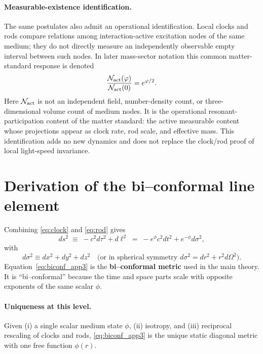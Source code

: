 \documentclass[11pt]{article}
\begin{document}
\paragraph{Measurable-existence identification.}
The same postulates also admit an operational identification.  Local clocks
and rods compare relations among interaction-active excitation nodes of the
same medium; they do not directly measure an independently observable empty
interval between such nodes.  In later mass-sector notation this common
matter-standard response is denoted
\[
  \frac{\mathcal N_{\rm act}(\phi)}
       {\mathcal N_{\rm act}(0)}
  = e^{\phi/2}.
\]
Here $\mathcal N_{\rm act}$ is not an independent field, number-density
count, or three-dimensional volume count of medium nodes.  It is the
operational resonant-participation content of the matter standard: the
active measurable content whose projections appear as clock rate, rod scale,
and effective mass.  This identification adds no new dynamics and does not
replace the clock/rod proof of local light-speed invariance.

\section{Derivation of the bi--conformal line element}\label{sec:derive}
Combining \eqref{eq:clock} and \eqref{eq:rod} gives
\begin{equation}
ds^2 \;\equiv\; -c^2d\tau^2 + d\ell^2
\;=\; -e^{\phi}c^2dt^2 + e^{-\phi}d\sigma^2,
\label{eq:biconf_app3}
\end{equation}
with
\begin{equation}
d\sigma^2 \equiv dx^2+dy^2+dz^2
\quad\text{(or in spherical symmetry }d\sigma^2=dr^2+r^2d\Omega^2\text{)}.
\end{equation}
Equation~\eqref{eq:biconf_app3} is the \textbf{bi--conformal metric} used in the main theory. It is ``bi--conformal'' because the time and space parts scale with opposite exponents of the same scalar $\phi$.

\paragraph{Uniqueness at this level.}
Given (i) a single scalar medium state $\phi$, (ii) isotropy, and (iii) reciprocal rescaling of clocks and rods, \eqref{eq:biconf_app3} is the unique static diagonal metric with one free function $\phi(r)$.
\end{document}
